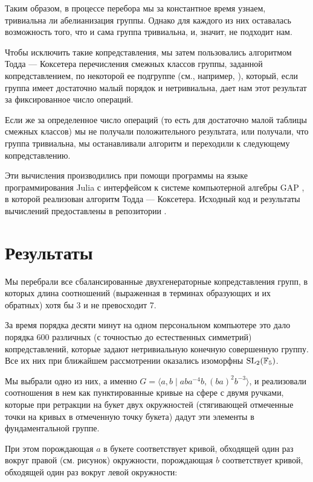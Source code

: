\documentclass[a4paper, 12pt]{article}
\begin{document}
    Таким образом, в процессе перебора мы за константное время узнаем, тривиальна ли абелианизация группы. Однако для каждого из них оставалась возможность того, что и сама группа тривиальна, и, значит, не подходит нам.

    Чтобы исключить такие копредставления, мы затем пользовались алгоритмом Тодда — Коксетера перечисления смежных классов группы, заданной копредставлением, по некоторой ее подгруппе (см., например, \cite[Chapter 5]{Holt2005}), который, если группа имеет достаточно малый порядок и нетривиальна, дает нам этот результат за фиксированное число операций.

    Если же за определенное число операций (то есть для достаточно малой таблицы смежных классов) мы не получали положительного результата, или получали, что группа тривиальна, мы останавливали алгоритм и переходили к следующему копредставлению.

    Эти вычисления производились при помощи программы на языке программирования Julia \cite{Julia-2017} с интерфейсом к системе компьютерной алгебры GAP \cite{GAP4}, в которой реализован алгоритм Тодда — Коксетера. Исходный код и результаты вычислений предоставлены в репозитории \cite{Dyakonov2023}.
    

\section{Результаты}
    Мы перебрали все сбалансированные двухгенераторные копредставления групп, в которых длина соотношений (выраженная в терминах образующих и их обратных) хотя бы 3 и не превосходит 7.

    За время порядка десяти минут на одном персональном компьютере это дало порядка 600 различных (с точностью до естественных симметрий) копредставлений, которые задают нетривиальную конечную совершенную группу. Все их них при ближайшем рассмотрении оказались изоморфны $\textnormal{SL}_2(\mathbb{F}_5)$.

    Мы выбрали одно из них, а именно $G = \langle a, b \mid a b a^{-4} b, (b a)^2 b^{-3} \rangle$, и реализовали соотношения в нем как пунктированные кривые на сфере с двумя ручками, которые при ретракции на букет двух окружностей (стягивающей отмеченные точки на кривых в отмеченную точку букета) дадут эти элементы в фундаментальной группе. 
    
    При этом порождающая $a$ в букете соответствует кривой, обходящей один раз вокруг правой (см. рисунок) окружности, порождающая $b$ соответствует кривой, обходящей один раз вокруг левой окружности: 
\end{document}
